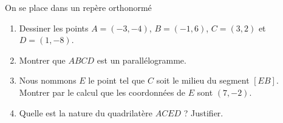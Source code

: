 
\begin{exercice}\label{exoSeconde-0021}

    On se place dans un repère orthonormé
    \begin{enumerate}
        \item
            Dessiner les points \( A=(-3,-4)\), \( B=(-1,6)\), \( C=(3,2)\) et \( D=(1,-8)\).
        \item
            Montrer que \( ABCD\) est un parallélogramme.
        \item
            Nous nommons \( E\) le point tel que \( C\) soit le milieu du segment \( [EB]\). Montrer par le calcul que les coordonnées de \( E\) sont \( (7,-2)\).
        \item
            Quelle est la nature du quadrilatère \( ACED\) ? Justifier.
    \end{enumerate}

\end{exercice}
